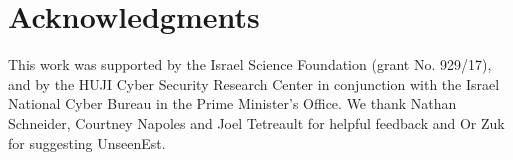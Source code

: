 \documentclass[11pt, a4paper]{article}
\newcommand{\lc}[1]{\footnote{\color{blue}LC: #1}}
\begin{document}
%
%
%

\section*{Acknowledgments}

This work was supported by the Israel Science Foundation (grant No. 929/17),
and by the HUJI Cyber Security Research Center in conjunction with the Israel
National Cyber Bureau in the Prime Minister's Office.
We thank Nathan Schneider, Courtney Napoles and Joel Tetreault for helpful feedback and Or Zuk for suggesting {\sc UnseenEst}.



\end{document}
